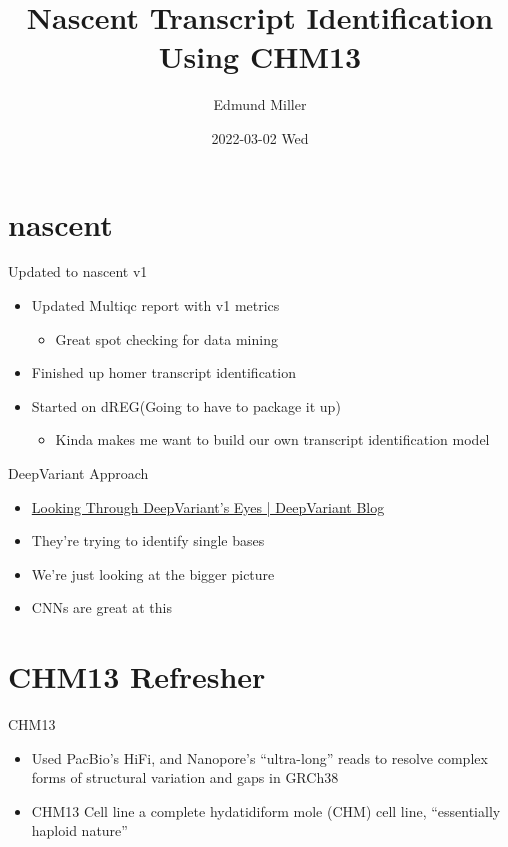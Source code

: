 \documentclass[bigger]{beamer}
\author{Edmund Miller}
\date{2022-03-02 Wed}
\title{Nascent Transcript Identification Using CHM13}
\begin{document}
\maketitle


\section{nascent}
\label{sec:org7ff6cbb}

\begin{frame}[label={sec:orgdd448d1}]{Updated to nascent v1}
\begin{itemize}
\item Updated Multiqc report with v1 metrics
\begin{itemize}
\item Great spot checking for data mining
\end{itemize}
\item Finished up homer transcript identification
\item Started on dREG(Going to have to package it up)
\begin{itemize}
\item Kinda makes me want to build our own transcript identification model
\end{itemize}
\end{itemize}
\end{frame}

\begin{frame}[label={sec:orga041001}]{DeepVariant Approach}
\begin{itemize}
\item \href{https://google.github.io/deepvariant/posts/2020-02-20-looking-through-deepvariants-eyes/}{Looking Through DeepVariant’s Eyes | DeepVariant Blog}
\item They're trying to identify single bases
\item We're just looking at the bigger picture
\item CNNs are great at this
\end{itemize}
\end{frame}

\section{CHM13 Refresher}
\label{sec:orga33669a}

\begin{frame}[label={sec:orgdc96348}]{CHM13}
\begin{itemize}
\item Used PacBio's HiFi, and Nanopore's ``ultra-long'' reads to resolve complex forms
of structural variation and gaps in GRCh38
\item CHM13 Cell line a complete hydatidiform mole (CHM) cell line, ``essentially
haploid nature''
\end{itemize}
\end{frame}
\end{document}
